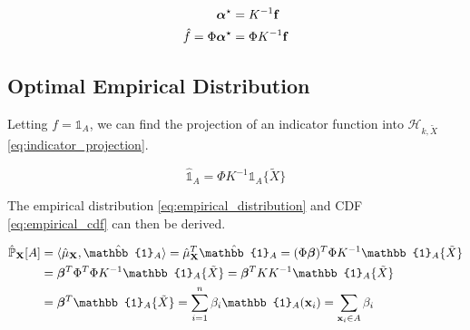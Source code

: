 \documentclass[twoside]{article} \usepackage{aistats2017}
\theoremstyle{definition}
\newcommand{\rv}[1]{{#1}}
\newcommand{\ds}[1]{\tilde{#1}}
\begin{document}
		
		\begin{equation}
		\begin{aligned}
			\bm{\alpha}^{\star} &= K^{-1} \mathbf{f} \\
			\hat{f} = \Phi \bm{\alpha}^{\star} &= \Phi K^{-1} \mathbf{f}
		\end{aligned}
		\label{eq:function_projection_solution}
		\end{equation}
		
		
	\subsection{Optimal Empirical Distribution}
	\label{sec:discriminative_quantile_regression:optimal_empirical_distribution}
	
		Letting $f = \mathbb{1}_{A}$, we can find the projection of an indicator function into $\mathcal{H}_{k, \ds{X}}$ \eqref{eq:indicator_projection}.
		
		\begin{equation}
			\hat{\mathbb{1}}_{A} = \Phi K^{-1} \mathbb{1}_{A}\{\ds{X}\}
		\label{eq:indicator_projection}
		\end{equation}
		
		The empirical distribution \eqref{eq:empirical_distribution} and CDF \eqref{eq:empirical_cdf} can then be derived.

		\begin{equation}
		\begin{aligned}
			\hat{\mathbb{P}}_{\bvec{\rv{X}}}[A] &= \langle \hat{\mu}_{\bvec{\rv{X}}}, \hat{\mathbb{1}}_{A} \rangle = \hat{\mu}_{\bvec{\rv{X}}}^{T}\hat{\mathbb{1}}_{A} = (\Phi \bm{\beta})^{T} \Phi K^{-1} \mathbb{1}_{A}\{\ds{X}\} \\
			&= \bm{\beta}^{T} \Phi^{T} \Phi K^{-1} \mathbb{1}_{A}\{\ds{X}\} = \bm{\beta}^{T} K K^{-1} \mathbb{1}_{A}\{\ds{X}\} \\
			&= \bm{\beta}^{T} \mathbb{1}_{A}\{\ds{X}\} = \sum_{i = 1}^{n} \beta_{i} \mathbb{1}_{A}(\bvec{x}_{i}) = \sum_{\bvec{x}_{i} \in A} \beta_{i}
		\end{aligned}
		\label{eq:empirical_distribution}
		\end{equation}
\end{document}
